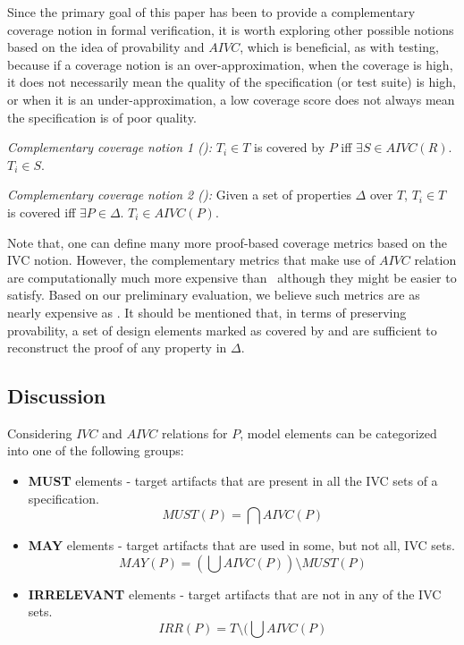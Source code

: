 Since the primary goal of
 this paper has been to provide a complementary coverage notion in
  formal verification, it is worth exploring other possible notions based on the idea of provability and $AIVC$, which is beneficial, as with testing, because if a coverage notion is an over-approximation, when the coverage
 is high, it does not necessarily mean the quality of
 the specification (or test suite) is high, or when it is an under-approximation, a low coverage score does not always mean the specification is of poor quality.

\begin{definition} {\emph{Complementary coverage notion 1 (\maycov):}}
  \label{def:comp-1}
   $T_i \in T$ is covered by $P$ iff $ \exists S
   \in AIVC(R)$. $T_i \in S$.
\end{definition}

\begin{definition} {\emph{Complementary coverage notion 2 (\allcov):}}
  \label{def:comp-2}
   Given a set of properties $\Delta$ over $T$, $T_i \in T$ is covered iff $\exists P \in \Delta$. $T_i \in AIVC(P)$.
\end{definition}

Note that, one can define many more proof-based coverage metrics based on the IVC notion. However, the complementary metrics that make use of $AIVC$ relation are computationally much more expensive than \ivccov\ although they might be easier to satisfy. Based on our preliminary evaluation, we believe such metrics are as nearly expensive as \nondetcov. It should be mentioned that, in terms of preserving provability, a set of design elements marked as covered by \maycov and \allcov are
sufficient to reconstruct the proof of any property in $\Delta$.


\subsection{Discussion}
\label{subsec:method-disc}

Considering $IVC$ and $AIVC$ relations for $P$, model elements can be categorized into one of the following groups:

\begin{itemize}
  \item \textbf{MUST} elements - target artifacts that are present in all the IVC sets of a specification.
      \[
      MUST (P) = \bigcap AIVC(P)
      \]

  \item \textbf{MAY} elements - target artifacts that are used in some, but not all, IVC sets.
      \[
      MAY(P) = (\bigcup AIVC (P)) \setminus MUST (P)
      \]

  \item \textbf{IRRELEVANT} elements - target artifacts that are not in any of the IVC sets.
  $$IRR(P) = T \setminus (\bigcup AIVC (P)$$
\end{itemize}

